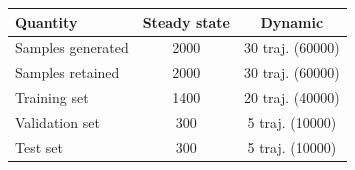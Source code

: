 \begin{tabular}{lcc}
\toprule
Quantity & Steady state & Dynamic \\
\midrule
Samples generated & 2000 & 30 traj. (60000) \\
Samples retained & 2000 & 30 traj. (60000) \\
Training set & 1400 & 20 traj. (40000) \\
Validation set & 300 & 5 traj. (10000) \\
Test set & 300 & 5 traj. (10000) \\
\bottomrule
\end{tabular}
